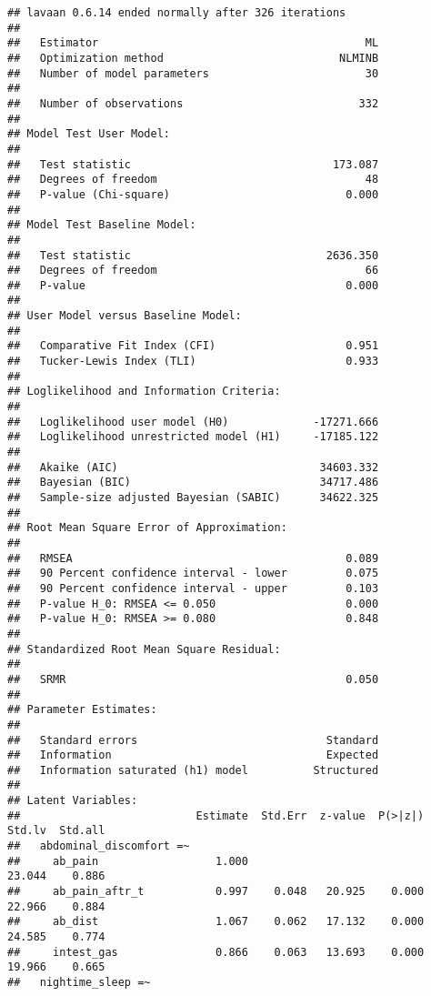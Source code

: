 \documentclass[
  man]{apa6}
\begin{document}
\begin{verbatim}
## lavaan 0.6.14 ended normally after 326 iterations
## 
##   Estimator                                         ML
##   Optimization method                           NLMINB
##   Number of model parameters                        30
## 
##   Number of observations                           332
## 
## Model Test User Model:
##                                                       
##   Test statistic                               173.087
##   Degrees of freedom                                48
##   P-value (Chi-square)                           0.000
## 
## Model Test Baseline Model:
## 
##   Test statistic                              2636.350
##   Degrees of freedom                                66
##   P-value                                        0.000
## 
## User Model versus Baseline Model:
## 
##   Comparative Fit Index (CFI)                    0.951
##   Tucker-Lewis Index (TLI)                       0.933
## 
## Loglikelihood and Information Criteria:
## 
##   Loglikelihood user model (H0)             -17271.666
##   Loglikelihood unrestricted model (H1)     -17185.122
##                                                       
##   Akaike (AIC)                               34603.332
##   Bayesian (BIC)                             34717.486
##   Sample-size adjusted Bayesian (SABIC)      34622.325
## 
## Root Mean Square Error of Approximation:
## 
##   RMSEA                                          0.089
##   90 Percent confidence interval - lower         0.075
##   90 Percent confidence interval - upper         0.103
##   P-value H_0: RMSEA <= 0.050                    0.000
##   P-value H_0: RMSEA >= 0.080                    0.848
## 
## Standardized Root Mean Square Residual:
## 
##   SRMR                                           0.050
## 
## Parameter Estimates:
## 
##   Standard errors                             Standard
##   Information                                 Expected
##   Information saturated (h1) model          Structured
## 
## Latent Variables:
##                           Estimate  Std.Err  z-value  P(>|z|)   Std.lv  Std.all
##   abdominal_discomfort =~                                                      
##     ab_pain                  1.000                              23.044    0.886
##     ab_pain_aftr_t           0.997    0.048   20.925    0.000   22.966    0.884
##     ab_dist                  1.067    0.062   17.132    0.000   24.585    0.774
##     intest_gas               0.866    0.063   13.693    0.000   19.966    0.665
##   nightime_sleep =~                                                            

\end{verbatim}
\end{document}
